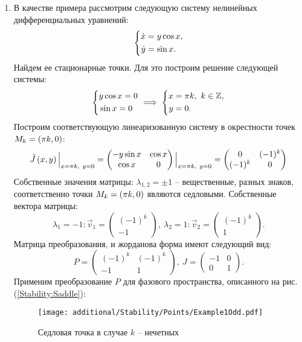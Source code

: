 		\begin{enumerate}

			\item В качестве примера рассмотрим следующую систему нелинейных дифференциальных уравнений:
				\[ \left\lbrace \begin{aligned} \dot{x} &= y \cos{x}, \\ \dot{y} &= \sin{x}. \end{aligned} \right. \]
				Найдем ее стационарные точки. Для это построим решение следующей системы:
				\[ \left\lbrace \begin{aligned} &y \cos{x} = 0 \\ &\sin{x} = 0 \end{aligned} \right. \implies \left\lbrace \begin{aligned} x &= \pi k, ~ k \in \mathbb{Z}, \\ y &= 0. \end{aligned} \right. \]
				Построим соответствующую линеаризованную систему в окрестности точек $M_k = \left( \pi k, 0 \right)$:
				\[ 
					\tilde{J} \left( x, y \right) \Bigl\vert \Bigr._{x = \pi k, ~ y = 0} = 
					\begin{pmatrix}
						-y \sin{x} & \cos{x} \\ \cos{x} & 0
					\end{pmatrix} \Bigl\vert \Bigr._{x = \pi k, ~ y = 0} = 
					\begin{pmatrix}
						0 & (-1)^k \\ (-1)^k & 0
					\end{pmatrix}
				\]
				Собственные значения матрицы: $\lambda_{1, 2} = \pm 1$ -- вещественные, разных знаков, соответственно точки $M_k = \left( \pi k, 0 \right)$ являются седловыми. Собственные вектора матрицы:
				\[ \lambda_1 = -1: \vec{v}_1 = \begin{pmatrix} (-1)^k \\ -1 \end{pmatrix}, ~ \lambda_2 = 1: \vec{v}_2 = \begin{pmatrix} (-1)^k \\ 1 \end{pmatrix}. \]
				Матрица преобразования, и жорданова форма имеют следующий вид:
				\[ P = \begin{pmatrix} (-1)^k & (-1)^k \\ -1 & 1 \end{pmatrix}, ~ J = \begin{pmatrix} -1 & 0 \\ 0 & 1 \end{pmatrix}. \]
				Применим преобразование $P$ для фазового пространства, описанного на рис. (\ref{Stability:Saddle}):
				\begin{multicols}{2}

					\begin{figure}[H]
						\centering
						\texttt{[image: additional/Stability/Points/Example1Odd.pdf]}
						\caption{Седловая точка в случае $k$ -- нечетных}
						\label{Stability:Example1Odd}
					\end{figure}


\end{multicols}
\end{enumerate}

